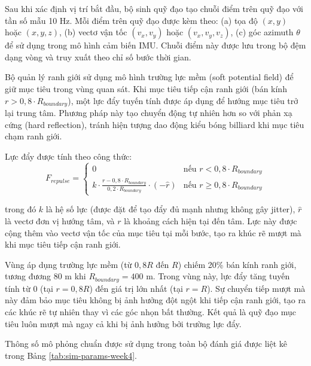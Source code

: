 Sau khi xác định vị trí bắt đầu, bộ sinh quỹ đạo tạo chuỗi điểm trên quỹ đạo với tần số mẫu 10 Hz. Mỗi điểm trên quỹ đạo được kèm theo: (a) tọa độ $(x, y)$ hoặc $(x, y, z)$, (b) vectơ vận tốc $(v_x, v_y)$ hoặc $(v_x, v_y, v_z)$, (c) góc azimuth $\theta$ để sử dụng trong mô hình cảm biến IMU. Chuỗi điểm này được lưu trong bộ đệm dạng vòng và truy xuất theo chỉ số bước thời gian.

Bộ quản lý ranh giới sử dụng mô hình trường lực mềm (soft potential field) để giữ mục tiêu trong vùng quan sát. Khi mục tiêu tiếp cận ranh giới (bán kính $r > 0{,}8 \cdot R_{boundary}$), một lực đẩy tuyến tính được áp dụng để hướng mục tiêu trở lại trung tâm. Phương pháp này tạo chuyển động tự nhiên hơn so với phản xạ cứng (hard reflection), tránh hiện tượng dao động kiểu bóng billiard khi mục tiêu chạm ranh giới.

Lực đẩy được tính theo công thức:
\begin{equation}
F_{repulse} = \begin{cases}
0 & \text{nếu } r < 0{,}8 \cdot R_{boundary} \\
k \cdot \frac{r - 0{,}8 \cdot R_{boundary}}{0{,}2 \cdot R_{boundary}} \cdot (-\hat{r}) & \text{nếu } r \geq 0{,}8 \cdot R_{boundary}
\end{cases}
\end{equation}

trong đó $k$ là hệ số lực (được đặt để tạo đẩy đủ mạnh nhưng không gây jitter), $\hat{r}$ là vectơ đơn vị hướng tâm, và $r$ là khoảng cách hiện tại đến tâm. Lực này được cộng thêm vào vectơ vận tốc của mục tiêu tại mỗi bước, tạo ra khúc rẽ mượt mà khi mục tiêu tiếp cận ranh giới.

Vùng áp dụng trường lực mềm (từ $0{,}8R$ đến $R$) chiếm 20\% bán kính ranh giới, tương đương 80 m khi $R_{boundary} = 400$ m. Trong vùng này, lực đẩy tăng tuyến tính từ 0 (tại $r = 0{,}8R$) đến giá trị lớn nhất (tại $r = R$). Sự chuyển tiếp mượt mà này đảm bảo mục tiêu không bị ảnh hưởng đột ngột khi tiếp cận ranh giới, tạo ra các khúc rẽ tự nhiên thay vì các góc nhọn bất thường. Kết quả là quỹ đạo mục tiêu luôn mượt mà ngay cả khi bị ảnh hưởng bởi trường lực đẩy.

Thông số mô phỏng chuẩn được sử dụng trong toàn bộ đánh giá được liệt kê trong Bảng \ref{tab:sim-params-week4}.

